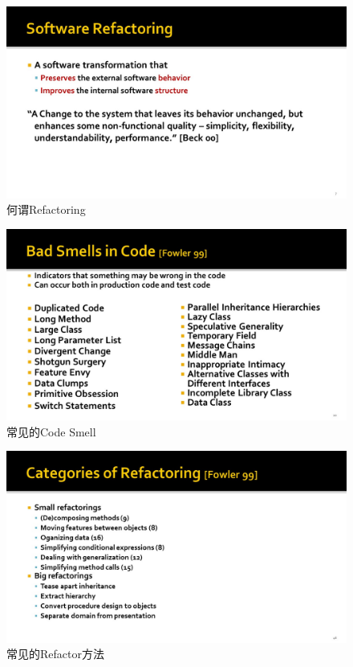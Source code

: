 \documentclass{ctexart}
\begin{document}
    \begin{figure}[ht!]
        \centering
        \includegraphics[width=\textwidth, height=\textheight, keepaspectratio]{refactor-2.jpg}
        \caption{何谓Refactoring}
    \end{figure}

    \begin{figure}[ht!]
        \centering
        \includegraphics[width=\textwidth, height=\textheight, keepaspectratio]{refactor-3.jpg}
        \caption{常见的Code Smell}
    \end{figure}

    \begin{figure}[ht!]
        \centering
        \includegraphics[width=\textwidth, height=\textheight, keepaspectratio]{refactor-4.jpg}
        \caption{常见的Refactor方法}
    \end{figure}
\end{document}
